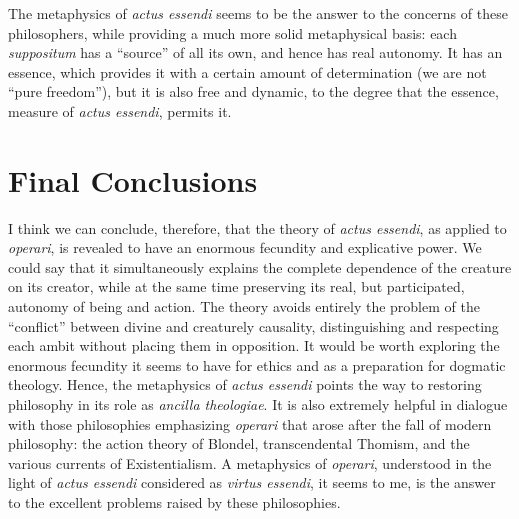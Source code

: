 %
The metaphysics of \emph{actus essendi} seems to be the answer to the concerns of these philosophers, while providing a much more solid metaphysical basis: each \emph{suppositum} has a ``source'' of  all its own, and hence has real autonomy. It has an essence, which provides it with a certain amount of determination (we are not ``pure freedom''), but it is also free and dynamic, to the degree that the essence, measure of \emph{actus essendi}, permits it.

\section{Final Conclusions}

I think we can conclude, therefore, that the theory of \emph{actus essendi}, as applied to \emph{operari}, is revealed to have an enormous fecundity and explicative power. We could say that it simultaneously explains the complete dependence of the creature on its creator, while at the same time preserving its real, but participated, autonomy of being and action. The theory avoids entirely the problem of the ``conflict'' between divine and creaturely causality, distinguishing and respecting each ambit without placing them in opposition. It would be worth exploring the enormous fecundity it seems to have for ethics and as a preparation for dogmatic theology. Hence, the metaphysics of \emph{actus essendi} points the way to restoring philosophy in its role as \emph{ancilla theologiae}. It is also extremely helpful in dialogue with those philosophies emphasizing \emph{operari} that arose after the fall of modern philosophy: the action theory of Blondel, transcendental Thomism, and the various currents of Existentialism. A metaphysics of \emph{operari}, understood in the light of \emph{actus essendi} considered as \emph{virtus essendi}, it seems to me, is the answer to the excellent problems raised by these philosophies. 

